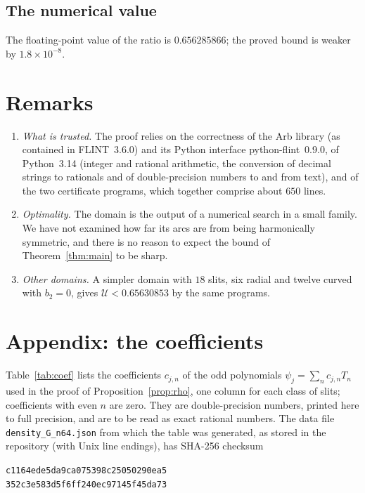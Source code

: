\documentclass[11pt]{amsart}
\theoremstyle{remark}
\newcommand{\U}{\mathcal U}
\begin{document}
\subsection*{The numerical value}
The floating-point value of the ratio is $0.656285866$; the proved bound is weaker by $1.8\times10^{-8}$.

\section{Remarks}

\begin{enumerate}[leftmargin=2em]
\item \emph{What is trusted.} The proof relies on the correctness of the Arb library \cite{Arb} (as contained in
FLINT~3.6.0) and its Python interface python-flint~0.9.0, of Python~3.14 (integer and rational arithmetic, the
conversion of decimal strings to rationals and of double-precision numbers to and from text), and of the two
certificate programs, which together comprise about $650$ lines.
\item \emph{Optimality.} The domain is the output of a numerical search in a small family. We have not examined
how far its arcs are from being harmonically symmetric, and there is no reason to expect the bound of
Theorem~\ref{thm:main} to be sharp.
\item \emph{Other domains.} A simpler domain with $18$ slits, six radial and twelve curved with $b_2=0$, gives
$\U<0.65630853$ by the same programs.
\end{enumerate}

\appendix
\section*{Appendix: the coefficients}

Table~\ref{tab:coef} lists the coefficients $c_{j,n}$ of the odd polynomials $\psi_j=\sum_nc_{j,n}T_n$ used in the
proof of Proposition~\ref{prop:rho}, one column for each class of slits; coefficients with even $n$ are zero.
They are double-precision numbers, printed here to full precision, and are to be read as exact rational numbers.
The data file \texttt{density\_G\_n64.json} from which the table was generated, as stored in the repository
(with Unix line endings), has SHA-256 checksum
\begin{center}\footnotesize\texttt{c1164ede5da9ca075398c25050290ea5\\352c3e583d5f6ff240ec97145f45da73}\end{center}
\end{document}
